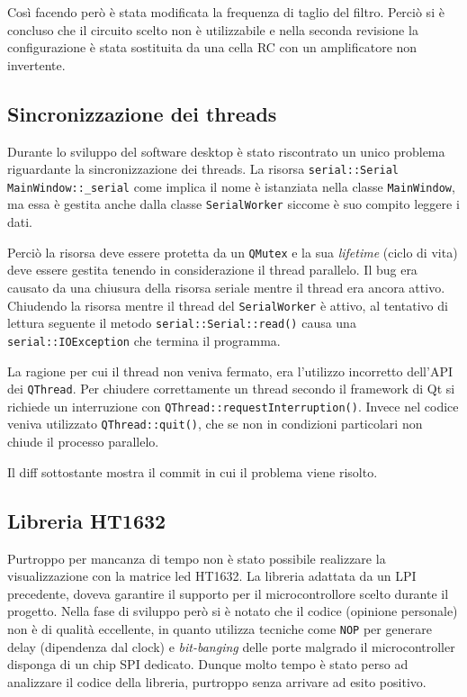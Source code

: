 Cos\`i facendo per\`o \`e stata modificata la frequenza di taglio del filtro.
Perci\`o si \`e concluso che il circuito scelto non \`e utilizzabile e nella
seconda revisione la configurazione \`e stata sostituita da una cella RC con
un amplificatore non invertente.

\subsection{Sincronizzazione dei threads}
\label{sec:err-sync}
Durante lo sviluppo del software desktop \`e stato riscontrato un unico
problema riguardante la sincronizzazione dei threads. La risorsa
\texttt{serial::Serial MainWindow::\_serial}  come implica il nome \`e
istanziata nella classe \texttt{MainWindow}, ma essa \`e gestita anche dalla
classe \texttt{SerialWorker} siccome \`e suo compito leggere i dati.

Perci\`o la risorsa deve essere protetta da un \texttt{QMutex} e la sua
\emph{lifetime} (ciclo di vita) deve essere gestita tenendo in considerazione
il thread parallelo.  Il bug era causato da una chiusura della risorsa seriale
mentre il thread era ancora attivo.  Chiudendo la risorsa mentre il thread del
\texttt{SerialWorker} \`e attivo, al tentativo di lettura seguente il metodo
\texttt{serial::Serial::read()} causa una \texttt{serial::IOException} che
termina il programma.

La ragione per cui il thread non veniva fermato, era l'utilizzo incorretto
dell'API dei \texttt{QThread}. Per chiudere correttamente un thread secondo il
framework di Qt si richiede un interruzione con
\texttt{QThread::requestInterruption()}. Invece nel codice veniva utilizzato
\texttt{QThread::quit()}, che se non in condizioni particolari non chiude il
processo parallelo.

Il diff  sottostante mostra il commit in cui il problema viene risolto.


\subsection{Libreria HT1632} \label{sec:ht1632}
Purtroppo per mancanza di tempo non \`e stato possibile realizzare la
visualizzazione con la matrice led HT1632. La libreria adattata da un LPI
precedente, doveva garantire il supporto per il microcontrollore scelto
durante il progetto. Nella fase di sviluppo per\`o si \`e notato che il codice
(opinione personale) non \`e di qualit\`a eccellente, in quanto utilizza
tecniche come \texttt{NOP} per generare delay (dipendenza dal clock) e
\textit{bit-banging} delle porte malgrado il microcontroller disponga di un
chip SPI dedicato.  Dunque molto tempo \`e stato perso ad analizzare il codice
della libreria, purtroppo senza arrivare ad esito positivo.

